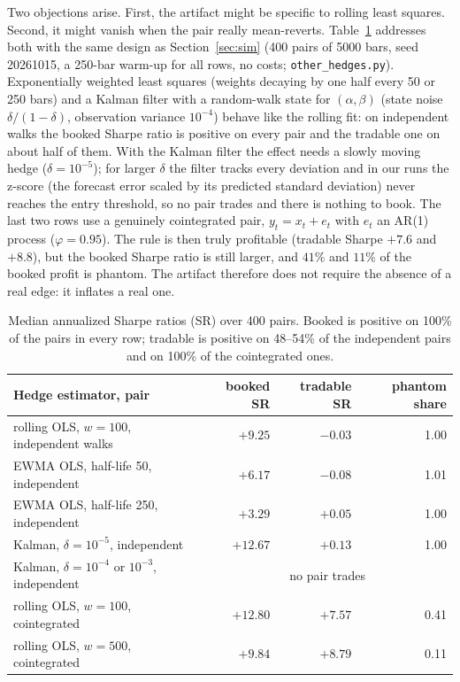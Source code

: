 \documentclass[11pt]{article}
\theoremstyle{remark}
\begin{document}
Two objections arise. First, the artifact might be specific to rolling least squares. Second, it might vanish when the
pair really mean-reverts. Table~\ref{tab:other} addresses both with the same design as Section~\ref{sec:sim} (400 pairs of
5000 bars, seed 20261015, a 250-bar warm-up for all rows, no costs; \texttt{other\_hedges.py}). Exponentially weighted
least squares (weights decaying by one half every 50 or 250 bars) and a Kalman filter with a random-walk state for $(\alpha,\beta)$ \cite{elliott2005} (state noise $\delta/(1-\delta)$, observation variance $10^{-4}$) behave like the rolling fit: on independent walks the booked Sharpe ratio is positive on every pair and the tradable one on about half of them. With the Kalman filter the effect needs a slowly moving hedge ($\delta=10^{-5}$); for larger
$\delta$ the filter tracks every deviation and in our runs the z-score (the forecast error scaled by its predicted standard deviation) never reaches the entry threshold, so no pair trades and there is nothing to book. The last two rows use a genuinely cointegrated pair, $y_t=x_t+e_t$ with $e_t$ an AR(1) process
($\varphi=0.95$). The rule is then truly profitable (tradable Sharpe $+7.6$ and $+8.8$), but the booked Sharpe ratio is
still larger, and $41\%$ and $11\%$ of the booked profit is phantom. The artifact therefore does not require the absence of
a real edge: it inflates a real one.

\begin{table}[htbp]
\centering
\begin{tabular}{lrrr}
\toprule
Hedge estimator, pair & booked SR & tradable SR & phantom share\\
\midrule
rolling OLS, $w=100$, independent walks & $+9.25$ & $-0.03$ & 1.00\\
EWMA OLS, half-life 50, independent & $+6.17$ & $-0.08$ & 1.01\\
EWMA OLS, half-life 250, independent & $+3.29$ & $+0.05$ & 1.00\\
Kalman, $\delta=10^{-5}$, independent & $+12.67$ & $+0.13$ & 1.00\\
Kalman, $\delta=10^{-4}$ or $10^{-3}$, independent & \multicolumn{3}{c}{no pair trades}\\
rolling OLS, $w=100$, cointegrated & $+12.80$ & $+7.57$ & 0.41\\
rolling OLS, $w=500$, cointegrated & $+9.84$ & $+8.79$ & 0.11\\
\bottomrule
\end{tabular}
\caption{Median annualized Sharpe ratios (SR) over 400 pairs. Booked is positive on 100\% of the pairs in every row;
tradable is positive on 48--54\% of the independent pairs and on 100\% of the cointegrated ones.}
\label{tab:other}
\end{table}
\end{document}

